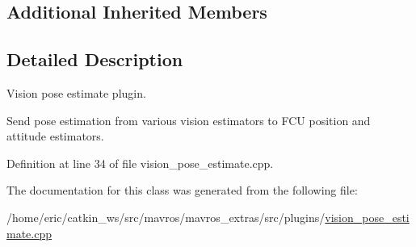\subsection*{Additional Inherited Members}


\subsection{Detailed Description}
Vision pose estimate plugin. 

Send pose estimation from various vision estimators to F\+CU position and attitude estimators. 

Definition at line 34 of file vision\+\_\+pose\+\_\+estimate.\+cpp.



The documentation for this class was generated from the following file\+:\begin{DoxyCompactItemize}
\item 
/home/eric/catkin\+\_\+ws/src/mavros/mavros\+\_\+extras/src/plugins/\mbox{\hyperlink{vision__pose__estimate_8cpp}{vision\+\_\+pose\+\_\+estimate.\+cpp}}\end{DoxyCompactItemize}
